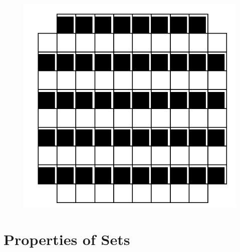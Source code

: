 \documentclass{article}
\renewcommand{\(}{\left(}
\renewcommand{\)}{\right)}
\theoremstyle{plain}
\theoremstyle{plain}
\theoremstyle{definition}
\begin{document}
\begin{figure}[h]
\includegraphics[scale=0.35]{fig2}
\caption{}
\label{fig2}
\end{figure}

\section{Properties of Sets}
\end{document}
